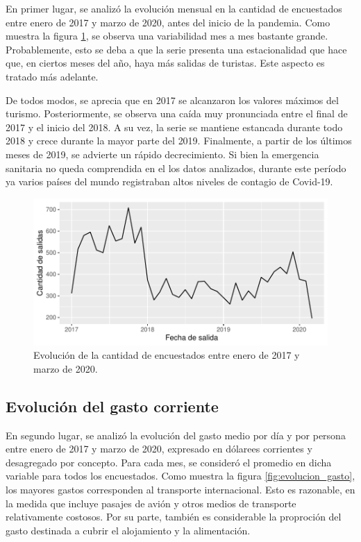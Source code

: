 \documentclass[
]{article}
\begin{document}
En primer lugar, se analizó la evolución mensual en la cantidad de
encuestados entre enero de 2017 y marzo de 2020, antes del inicio de la
pandemia. Como muestra la figura \ref{fig:evolucion}, se observa una
variabilidad mes a mes bastante grande. Probablemente, esto se deba a
que la serie presenta una estacionalidad que hace que, en ciertos meses
del año, haya más salidas de turistas. Este aspecto es tratado más
adelante.

De todos modos, se aprecia que en 2017 se alcanzaron los valores máximos
del turismo. Posteriormente, se observa una caída muy pronunciada entre
el final de 2017 y el inicio del 2018. A su vez, la serie se mantiene
estancada durante todo 2018 y crece durante la mayor parte del 2019.
Finalmente, a partir de los últimos meses de 2019, se advierte un rápido
decrecimiento. Si bien la emergencia sanitaria no queda comprendida en
el los datos analizados, durante este período ya varios países del mundo
registraban altos niveles de contagio de Covid-19.

\begin{figure}[H]

{\centering \includegraphics{Informe-Proyectofinal_files/figure-latex/evolucion-1} 

}

\caption{Evolución de la cantidad de encuestados entre enero de 2017 y marzo de 2020.}\label{fig:evolucion}
\end{figure}

\hypertarget{evoluciuxf3n-del-gasto-corriente}{%
\subsection{Evolución del gasto
corriente}\label{evoluciuxf3n-del-gasto-corriente}}

En segundo lugar, se analizó la evolución del gasto medio por día y por
persona entre enero de 2017 y marzo de 2020, expresado en dólarees
corrientes y desagregado por concepto. Para cada mes, se consideró el
promedio en dicha variable para todos los encuestados. Como muestra la
figura \ref{fig:evolucion_gasto}, los mayores gastos corresponden al
transporte internacional. Esto es razonable, en la medida que incluye
pasajes de avión y otros medios de transporte relativamente costosos.
Por su parte, también es considerable la proproción del gasto destinada
a cubrir el alojamiento y la alimentación.
\end{document}
